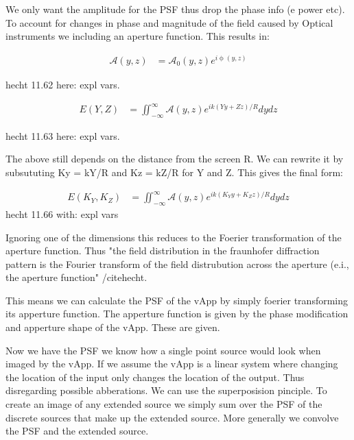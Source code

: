 We only want the amplitude for the PSF thus drop the phase info (e power etc). To account for changes in phase and magnitude of the field caused by Optical instruments we including an aperture function. This results in:


\begin{subequations}
  \begin{align}
    \mathscr{A}(y,z) &= \mathscr{A}_0 (y,z)e^{i\upphi(y,z)}
  \end{align}
\end{subequations}

hecht 11.62
here: expl vars.  

\begin{subequations}
  \begin{align}
    E(Y,Z) &= \iint_{-\infty}^{\infty} \mathscr{A}(y,z) e^{ik(Yy+Zz)/R} dydz
  \end{align}
\end{subequations}

hecht 11.63
here: expl vars.  

The above still depends on the distance from the screen R. We can rewrite it by subsututing Ky = kY/R and Kz = kZ/R for Y and Z. This gives the final form: 

\begin{subequations}
  \begin{align}
    E(K_Y,K_Z) &= \iint_{-\infty}^{\infty} \mathscr{A}(y,z) e^{ik(K_Yy+K_Zz)/R} dydz
  \end{align}
\end{subequations}
hecht 11.66
with: expl vars

Ignoring one of the dimensions this reduces to the Foerier transformation of the aperture function. Thus "the field distribution in the fraunhofer diffraction pattern is the Fourier transform of the field distrubution across the aperture (e.i., the aperture function" /cite{hecht}. 

This means we can calculate the PSF of the vApp by simply foerier transforming its apperture function. The apperture function is given by the phase modification and apperture shape of the vApp. These are given.

Now we have the PSF we know how a single point source would look when imaged by the vApp. If we assume the vApp is a linear system where changing the location of the input only changes the location of the output. Thus disregarding possible abberations. We can use the superposision pinciple. To create an image of any extended source we simply sum over the PSF of the discrete sources that make up the extended source. More generally we convolve the PSF and the extended source.


